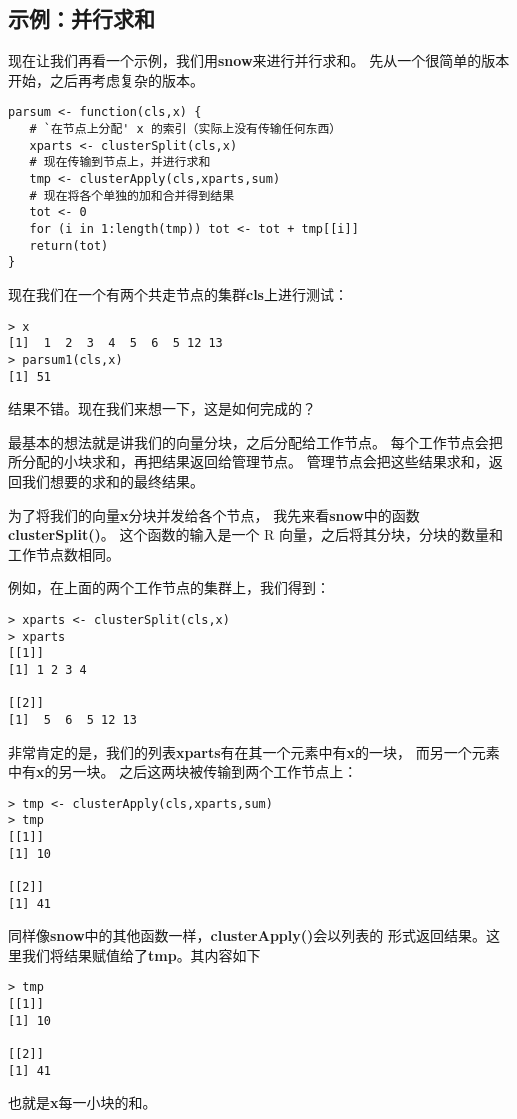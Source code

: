 \subsection{示例：并行求和}

现在让我们再看一个示例，我们用{\bf snow}来进行并行求和。
先从一个很简单的版本开始，之后再考虑复杂的版本。

\begin{lstlisting}
parsum <- function(cls,x) {
   # `在节点上分配' x 的索引（实际上没有传输任何东西）
   xparts <- clusterSplit(cls,x)
   # 现在传输到节点上，并进行求和
   tmp <- clusterApply(cls,xparts,sum)
   # 现在将各个单独的加和合并得到结果
   tot <- 0
   for (i in 1:length(tmp)) tot <- tot + tmp[[i]]
   return(tot)
}
\end{lstlisting}

现在我们在一个有两个共走节点的集群{\bf cls}上进行测试：

\begin{lstlisting}
> x
[1]  1  2  3  4  5  6  5 12 13
> parsum1(cls,x)
[1] 51
\end{lstlisting}

结果不错。现在我们来想一下，这是如何完成的？

最基本的想法就是讲我们的向量分块，之后分配给工作节点。
每个工作节点会把所分配的小块求和，再把结果返回给管理节点。
管理节点会把这些结果求和，返回我们想要的求和的最终结果。

为了将我们的向量{\bf x}分块并发给各个节点，
我先来看{\bf snow}中的函数{\bf clusterSplit()}。
这个函数的输入是一个 R 向量，之后将其分块，分块的数量和
工作节点数相同。

例如，在上面的两个工作节点的集群上，我们得到：

\begin{lstlisting}
> xparts <- clusterSplit(cls,x)
> xparts
[[1]]
[1] 1 2 3 4

[[2]]
[1]  5  6  5 12 13
\end{lstlisting}

非常肯定的是，我们的列表{\bf xparts}有在其一个元素中有{\bf x}的一块，
而另一个元素中有{\bf x}的另一块。
之后这两块被传输到两个工作节点上：

\begin{lstlisting}
> tmp <- clusterApply(cls,xparts,sum)
> tmp
[[1]]
[1] 10

[[2]]
[1] 41
\end{lstlisting}

同样像{\bf snow}中的其他函数一样，{\bf clusterApply()}会以列表的
形式返回结果。这里我们将结果赋值给了{\bf tmp}。其内容如下
\begin{lstlisting}
> tmp
[[1]]
[1] 10

[[2]]
[1] 41
\end{lstlisting}
也就是{\bf x}每一小块的和。

